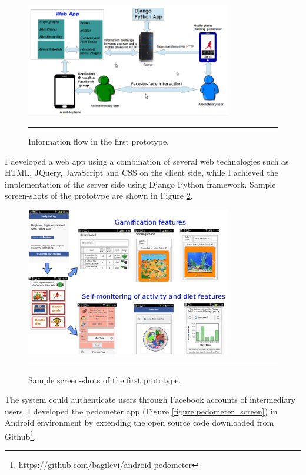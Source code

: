 \begin{figure}[htbp]
  \centering
    \includegraphics[width=0.8\textwidth]{Figures/prototype_1a.png}
    \rule{35em}{0.5pt}
  \caption{Information flow in the first prototype.}
  \label{figure:prototype_1}
\end{figure}

I developed a web app using a combination of several web technologies such as HTML, JQuery, JavaScript and CSS on the client side, while I achieved the implementation of the server side using Django Python framework. Sample screen-shots of the prototype are shown in Figure \ref{figure:prototype_1_screens}. 

\begin{figure}[htbp]
  \centering
    \includegraphics[width=0.8\textwidth]{Figures/Version1/Prototype1Screenshots.png}
    \rule{35em}{0.5pt}
  \caption{Sample screen-shots of the first prototype.}
  \label{figure:prototype_1_screens}
\end{figure}

The system could authenticate users through Facebook accounts of intermediary users. I developed the pedometer app (Figure \ref{figure:pedometer_screen}) in Android environment by extending the open source code downloaded from Github\footnote{https://github.com/bagilevi/android-pedometer}. 

